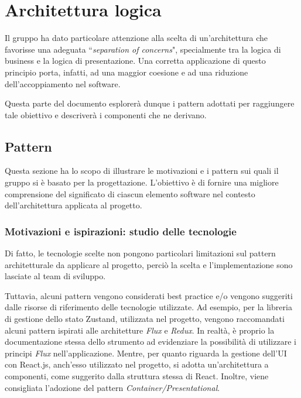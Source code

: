 \section{Architettura logica}\label{sec:architettura_logica}
Il gruppo ha dato particolare attenzione alla scelta di un'architettura che favorisse una adeguata ``\textit{separation of concerns}", specialmente tra la logica di business e la logica di presentazione. Una corretta applicazione di questo principio porta, infatti, ad una maggior coesione e ad una riduzione dell'accoppiamento nel software.

Questa parte del documento esplorerà dunque i pattern adottati per raggiungere tale obiettivo e descriverà i componenti che ne derivano.

\subsection{Pattern}\label{sec:pattern_e_tecnologie}
Questa sezione ha lo scopo di illustrare le motivazioni e i pattern sui quali il gruppo si è basato per la progettazione. L'obiettivo è di fornire una migliore comprensione del significato di ciascun elemento software nel contesto dell'architettura applicata al progetto.

\subsubsection{Motivazioni e ispirazioni: studio delle tecnologie}
\par Di fatto, le tecnologie scelte non pongono particolari limitazioni sul pattern architetturale da applicare al progetto, perciò la scelta e l'implementazione sono lasciate al team di sviluppo. 

Tuttavia, alcuni pattern vengono considerati best practice e/o vengono suggeriti dalle risorse di riferimento delle tecnologie utilizzate. Ad esempio, per la libreria di gestione dello stato Zustand, utilizzata nel progetto, vengono raccomandati alcuni pattern ispirati alle architetture \textit{Flux} e \textit{Redux}. In realtà, è proprio la documentazione stessa dello strumento ad evidenziare la possibilità di utilizzare i principi \textit{Flux} nell'applicazione. Mentre, per quanto riguarda la gestione dell'UI con React.js, anch'esso utilizzato nel progetto, si adotta un'architettura a componenti, come suggerito dalla struttura stessa di React. Inoltre, viene consigliata l'adozione del pattern \textit{Container/Presentational}.

